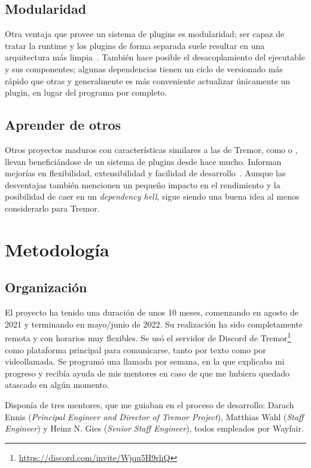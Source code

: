\subsection{Modularidad}

Otra ventaja que provee un sistema de plugins es modularidad; ser capaz de
tratar la runtime y los plugins de forma separada suele resultar en una
arquitectura más limpia~\cite{baldwin2000design}. También hace posible el
desacoplamiento del ejecutable y sus componentes; algunas dependencias tienen un
ciclo de versionado más rápido que otras y generalmente es más conveniente
actualizar únicamente un plugin, en lugar del programa por completo.

\subsection{Aprender de otros}

Otros proyectos maduros con características similares a las de Tremor, como
\textcite{nginx} o \textcite{apachehttpserver}, llevan beneficiándose de un
sistema de plugins desde hace mucho. Informan mejorías en flexibilidad,
extensibilidad y facilidad de
desarrollo~\cite{nginxPluginsAdvantages}\cite{apachePluginsAdvantages}. Aunque
las desventajas también mencionen un pequeño impacto en el rendimiento y la
posibilidad de caer en un \emph{dependency hell}, sigue siendo una buena idea al
menos considerarlo para Tremor.

\section{Metodología}

\subsection{Organización}

El proyecto ha tenido una duración de unos 10 meses, comenzando en agosto de
2021 y terminando en mayo/junio de 2022. Su realización ha sido completamente
remota y con horarios muy flexibles. Se usó el servidor de Discord de
Tremor\footnote{\url{https://discord.com/invite/Wjqu5H9rhQ}} como plataforma
principal para comunicarse, tanto por texto como por videollamada. Se programó
una llamada por semana, en la que explicaba mi progreso y recibía ayuda de mis
mentores en caso de que me hubiera quedado atascado en algún momento.

Disponía de tres mentores, que me guiaban en el proceso de desarrollo: Darach
Ennis (\emph{Principal Engineer and Director of Tremor Project}), Matthias Wahl
(\emph{Staff Engineer}) y Heinz N. Gies (\emph{Senior Staff Engineer}), todos
empleados por Wayfair.

